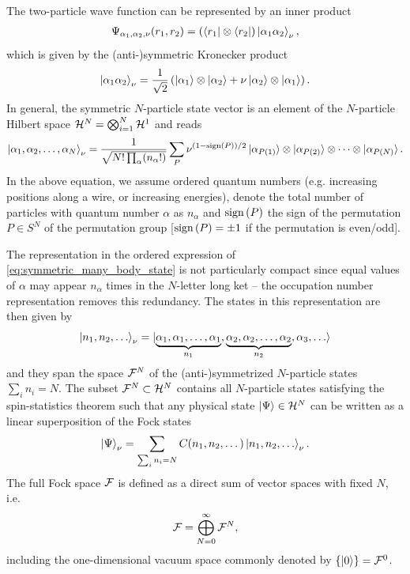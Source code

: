 The two-particle wave function can be represented by an inner product
\begin{align}
    \Psi_{\alpha_1,\alpha_2,\nu}(r_1,r_2) = \left(\bra{r_1}\otimes\bra{r_2}\right)\ket{\alpha_1 \alpha_2}_\nu,
\end{align}
which is given by the (anti-)symmetric Kronecker product
\begin{align}
    \ket{\alpha_1 \alpha_2}_\nu = \frac1{\sqrt2}\left(\ket{\alpha_1}\otimes\ket{\alpha_2} + \nu\ket{\alpha_2}\otimes\ket{\alpha_1}\right).
\end{align}
In general, the symmetric $N$-particle state vector is an element of the $N$-particle Hilbert space $\mathcal{H}^N = \bigotimes_{i=1}^N\mathcal{H}^1$ and reads
\begin{align}
    \ket{\alpha_1,\alpha_2,\dots,\alpha_N}_\nu = \frac1{\sqrt{N!\prod_{\alpha}(n_\alpha!)}}\sum_P \nu^{(1-\text{sign}\left( P \right))/2}\ket{\alpha_{P(1)}}\otimes\ket{\alpha_{P(2)}}\otimes\dots\otimes\ket{\alpha_{P(N)}}.
    \label{eq:symmetric_many_body_state}
\end{align}
In the above equation, we assume ordered quantum numbers (e.g. increasing positions along a wire, or increasing energies), denote the total number of particles with quantum number $\alpha$ as $n_\alpha$ and $\text{sign}\left( P \right)$ the sign of the permutation $P\in S^N$ of the permutation group [$\text{sign}\left( P \right)=\pm1$ if the permutation is even/odd].

The representation in the ordered expression of \cref{eq:symmetric_many_body_state} is not particularly compact since equal values of $\alpha$ may appear $n_\alpha$ times in the $N$-letter long ket -- the occupation number representation removes this redundancy.
The states in this representation are then given by
\begin{align}
    \ket{n_1, n_2, \dots}_\nu = \ket{\underbrace{\alpha_1,\alpha_1,\dots,\alpha_1}_{n_1}, \underbrace{\alpha_2, \alpha_2,\dots, \alpha_2}_{n_2}, \alpha_3, \dots}
\end{align}
and they span the space $\mathcal{F}^N$ of the (anti-)symmetrized $N$-particle states $\sum_{i} n_i = N$.
The subset $\mathcal{F}^N\subset \mathcal{H}^N$ contains all $N$-particle states satisfying the spin-statistics theorem such that any physical state $\ket{\Psi}\in\mathcal{H}^N$ can be written as a linear superposition of the Fock states
\begin{align}
    \ket{\Psi}_\nu = \sum_{\sum_i n_i = N}C(n_1,n_2,\dots)\ket{n_1,n_2,\dots}_\nu.
\end{align}
The full Fock space $\mathcal{F}$ is defined as a direct sum of vector spaces with fixed $N$, i.e.
\begin{align}
    \mathcal{F} = \bigoplus_{N=0}^\infty \mathcal{F}^N,
\end{align}
including the one-dimensional vacuum space commonly denoted by $\{\ket{0}\}=\mathcal{F}^0$.

